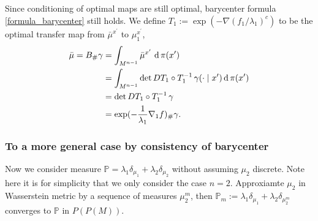 Since conditioning of optimal maps are still optimal,
barycenter formula \cref{formula_barycenter} still holds.
We define $T_1 := \exp(-\nabla (f_1/\lambda_1)^c)$ to be the optimal transfer map from $\bar{\mu}^{x^\prime}$ to $\mu_1^{x^\prime}$,
\begin{align*}
	\bar{\mu} = B_{\#} \gamma & =
	\int_{M^{n-1}}\bar{\mu}^{x^\prime} \, \operatorname{d} \pi(x^\prime)                         \\
	                          & = \int_{M^{n-1}}
	\det D T_1  \circ T_1^{-1}\, \gamma(\cdot \mid x^\prime) \operatorname{d} \pi(x^\prime)      \\
	                          & = \det D T_1  \circ T_1^{-1}\, \gamma                 \\
	                          & = \exp (- \frac{1}{\lambda_1} \nabla_1 f)_{\#} \gamma
														.
\end{align*}



\subsubsection{To a more general case by consistency of barycenter}

Now we consider measure $\mathbb{P} = \lambda_1 \delta_{\mu_1} + \lambda_2 \delta_{\mu_2}$
without assuming $\mu_2$ discrete.
Note here it is for simplicity that we only consider the case $n=2$.
Approxiamte $\mu_2$ in Wasserstein metric by a sequence of measures $\mu_2^{m}$,
then $\mathbb{P}_m := \lambda_1 \delta_{\mu_1} + \lambda_2 \delta_{\mu_2^m}$ converges to $\mathbb{P}$
in $P(P(M))$.

